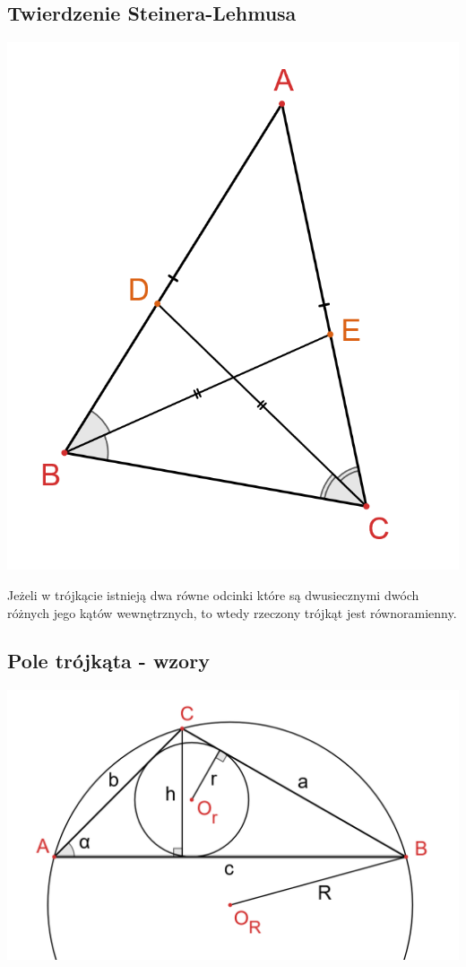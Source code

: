 \documentclass[14pt,a4paper]{extarticle}
\begin{document}
\subsection{Twierdzenie Steinera-Lehmusa}
\begin{center}\includegraphics[scale=0.4]{geometria/twierdzenie Steinera-Lehmusa.png}\end{center}
\noindent Jeżeli w trójkącie istnieją dwa równe odcinki które są dwusiecznymi dwóch różnych jego kątów wewnętrznych,
to wtedy rzeczony trójkąt jest równoramienny.

\subsection{Pole trójkąta - wzory}
\begin{center}\includegraphics[scale=0.5]{geometria/pole trójkąta.png}\end{center}
\end{document}
